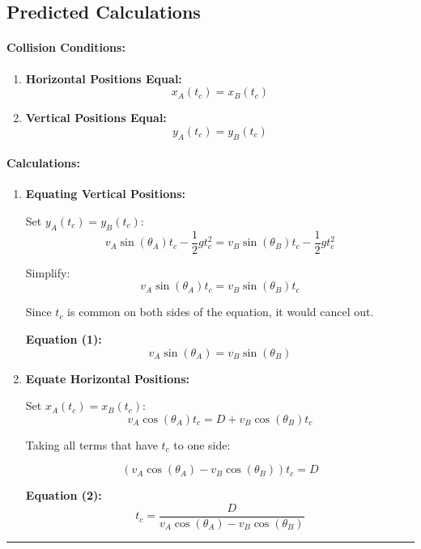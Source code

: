 \documentclass[12pt]{article}
\begin{document}
\subsection{Predicted Calculations}

\paragraph{Collision Conditions:}
\begin{enumerate}
    \item \textbf{Horizontal Positions Equal:}
    \[
    x_A(t_c) = x_B(t_c)
    \]
    
    \item \textbf{Vertical Positions Equal:}
    \[
    y_A(t_c) = y_B(t_c)
    \]
\end{enumerate}

\paragraph{Calculations:}
\begin{enumerate}
    \item \textbf{Equating Vertical Positions:} 
    
    Set \( y_A(t_c) = y_B(t_c) \):
    \[
    v_A \sin(\theta_A) t_c - \frac{1}{2} g t_c^2 = v_B \sin(\theta_B) t_c - \frac{1}{2} g t_c^2
    \]
    
    Simplify:
    \[
    v_A \sin(\theta_A) t_c = v_B \sin(\theta_B) t_c
    \]
    
    Since \( t_c \) is common on both sides of the equation, it would cancel out.
    
    \textbf{Equation (1):}
    \[
    v_A \sin(\theta_A) = v_B \sin(\theta_B)
    \]
    
    \item \textbf{Equate Horizontal Positions:} 
    
    Set \( x_A(t_c) = x_B(t_c) \):
    \[
    v_A \cos(\theta_A) t_c = D + v_B \cos(\theta_B) t_c
    \]
    
    Taking all terms that have \( t_c \) to one side:

    \[
    (v_A \cos(\theta_A) - v_B \cos(\theta_B)) t_c = D
    \]
    
    \textbf{Equation (2):}
    \[
    t_c = \frac{D}{v_A \cos(\theta_A) - v_B \cos(\theta_B)}
    \]
\end{enumerate}

\vspace{0.5cm} %
\begin{center}
    \rule{0.9\textwidth}{0.5pt} %
\end{center}
\vspace{0.5cm} %
\end{document}
